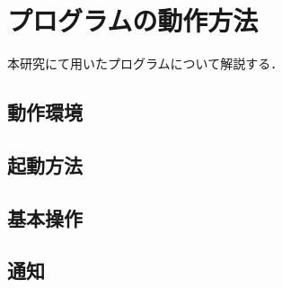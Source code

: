 \chapter{プログラムの動作方法}
本研究にて用いたプログラムについて解説する．

\section{動作環境}

\section{起動方法}

\section{基本操作}

\section{通知}
